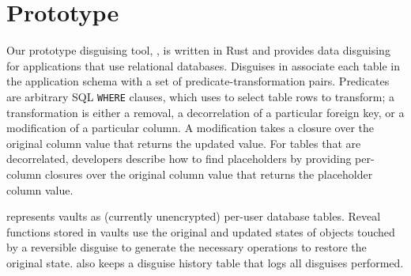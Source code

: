 \section{Prototype}
\label{sec:proto}
%
Our prototype disguising tool, \sys, is written in Rust and
provides data disguising for applications that use relational databases.
%
Disguises in \sys associate each table in the application schema with a set of
predicate-transformation pairs.
%
Predicates are arbitrary SQL \texttt{WHERE} clauses, which \sys uses
to select table rows to transform; a transformation is either a removal, a
decorrelation of a particular foreign key, or a modification of a particular
column.
%
A modification takes a closure over the original column value that returns the
updated value.
%
For tables that are decorrelated, developers describe how to find placeholders
by providing per-column closures over the original column value that returns the
placeholder column value.
%

%
\sys represents vaults as (currently unencrypted) per-user database tables.
%
Reveal functions stored in vaults use the original and updated states of objects
touched by a reversible disguise to generate the necessary operations to restore the
original state.
%
\sys also keeps a disguise history table that logs all disguises performed.

\iffalse
\sys also provides a specification of the end-state after it applies a sequence of
disguises; this allows developers to double-check that their disguises achieve their privacy
transformation goals.
%
To do so, \sys automatically generates a sequence of materialized view filters that, when applied on top of each
other, correspond to the state achieved by composing the disguises.
Developers specify assertions (\eg all objects belonging to departing user Bob have
been removed) that \sys ensures holds on the materialized view specification.

\sys's composition technique may reorder filters from one disguise with those from a subsequent disguise in order to achieve the
correct result.
%
\sys maps these filters directly to physical database operations (where reordering filters corresponds to
temporarily undoing vault entries). Thus, the developer can use the materialized view filters as a way to
test the correctness of \sys and their disguises prior to permanently altering the application database.
\fi

